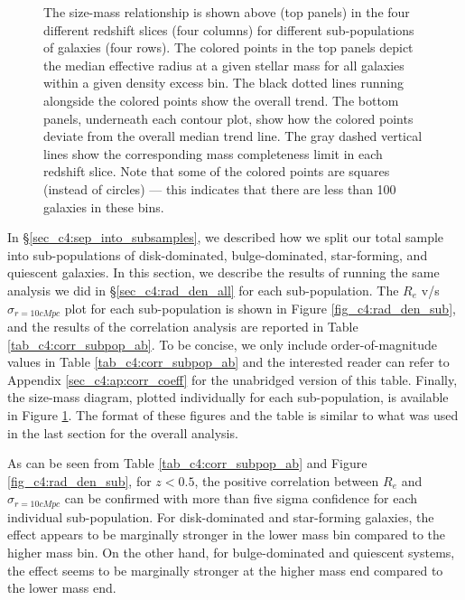 \begin{figure}
    \begin{center}
  \end{center}
  \caption{The size-mass relationship is shown above (top panels) in the four different redshift slices (four columns) for different sub-populations of galaxies (four rows). The colored points in the top panels depict the median effective radius at a given stellar mass for all galaxies within a given density excess bin. The black dotted lines running alongside the colored points show the overall trend. The bottom panels, underneath each contour plot, show how the colored points deviate from the overall median trend line. The gray dashed vertical lines show the corresponding mass completeness limit in each redshift slice. Note that some of the colored points are squares (instead of circles) --- this indicates that there are less than 100 galaxies in these bins.}
    \label{fig_c4:r_m_sub}
\end{figure}


In \S \ref{sec_c4:sep_into_subsamples}, we described how we split our total sample into sub-populations of disk-dominated, bulge-dominated, star-forming, and quiescent galaxies. In this section, we describe the results of running the same analysis we did in \S \ref{sec_c4:rad_den_all} for each sub-population. The $R_e$ v/s $\sigma_{r=10cMpc}$ plot for each sub-population is shown in Figure \ref{fig_c4:rad_den_sub}, and the results of the correlation analysis are reported in Table \ref{tab_c4:corr_subpop_ab}. To be concise, we only include order-of-magnitude values in Table \ref{tab_c4:corr_subpop_ab} and the interested reader can refer to Appendix \ref{sec_c4:ap:corr_coeff} for the unabridged version of this table. Finally, the size-mass diagram, plotted individually for each sub-population, is available in Figure \ref{fig_c4:r_m_sub}. The format of these figures and the table is similar to what was used in the last section for the overall analysis. 

As can be seen from Table \ref{tab_c4:corr_subpop_ab} and Figure \ref{fig_c4:rad_den_sub}, for $z < 0.5$, the positive correlation between $R_e$ and $\sigma_{r=10cMpc}$ can be confirmed with more than five sigma confidence for each individual sub-population. For disk-dominated and star-forming galaxies, the effect appears to be marginally stronger in the lower mass bin compared to the higher mass bin. On the other hand, for bulge-dominated and quiescent systems, the effect seems to be marginally stronger at the higher mass end compared to the lower mass end. 

